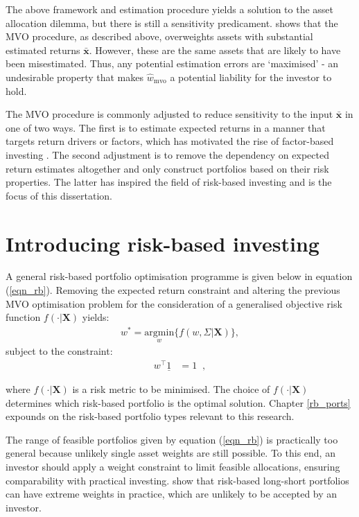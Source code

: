 \documentclass[a4paper,11pt,nocenter,bold,noupper,headcount]{mythesis}
\theoremstyle{plain}
\theoremstyle{definition}
\begin{document}
The above framework and estimation procedure yields a solution to the asset allocation dilemma, but there is still a sensitivity predicament. \cite{M89} shows that the MVO procedure, as described above, overweights assets with substantial estimated returns $\mathbf{\bar{x}}$. However, these are the same assets that are likely to have been misestimated. Thus, any potential estimation errors are `maximised' - an undesirable property that makes $\hat{w}_\mathrm{mvo}$ a potential liability for the investor to hold.

The MVO procedure is commonly adjusted to reduce sensitivity to the input $\mathbf{\bar{x}}$ in one of two ways. The first is to estimate expected returns in a manner that targets return drivers or factors, which has motivated the rise of factor-based investing \citep{A14}. The second adjustment is to remove the dependency on expected return estimates altogether and only construct portfolios based on their risk properties. The latter has inspired the field of risk-based investing and is the focus of this dissertation. 

\section{Introducing risk-based investing} 

A general risk-based portfolio optimisation programme is given below in equation (\ref{eqn_rb}). Removing the expected return constraint and altering the previous MVO optimisation problem for the consideration of a generalised objective risk function $f(\cdot| \textbf{X})$ yields:
\begin{align} \label{eqn_rb}
w^* = \underset{w}{\text{argmin}} \Big \{ f(w, \Sigma| \textbf{X}) \Big \},
\end{align}
subject to the constraint:
\begin{align*}
w^\intercal \underline{1} &= 1 \;\; ,
\end{align*}

where $f(\cdot | \textbf{X})$ is a risk metric to be minimised. The choice of $f(\cdot | \textbf{X})$ determines which risk-based portfolio is the optimal solution. Chapter \ref{rb_ports} expounds on the risk-based portfolio types relevant to this research.

The range of feasible portfolios given by equation (\ref{eqn_rb}) is practically too general because unlikely single asset weights are still possible. To this end, an investor should apply a weight constraint to limit feasible allocations, ensuring comparability with practical investing. \cite{JM03} show that risk-based long-short portfolios can have extreme weights in practice, which are unlikely to be accepted by an investor. 
\end{document}
